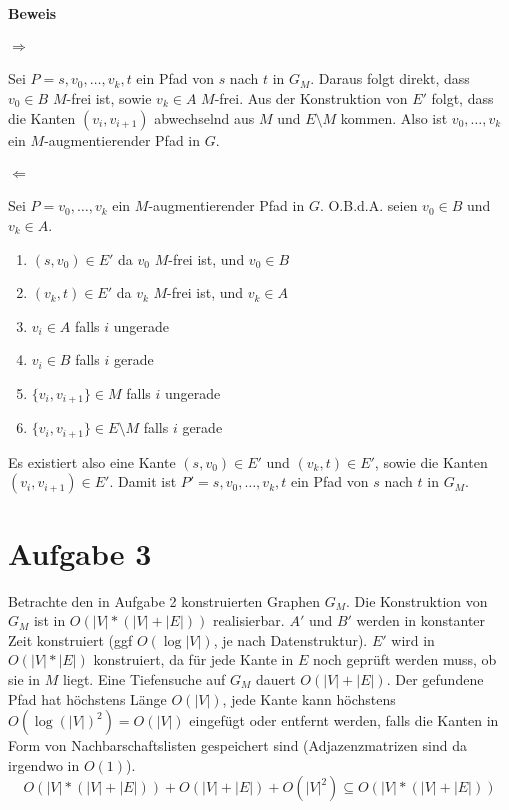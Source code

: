 \documentclass[10pt,a4paper]{article}
\begin{document}
\paragraph{Beweis}

\paragraph{$\Rightarrow$}
Sei $P = s, v_0, \ldots, v_k, t$ ein Pfad von $s$ nach $t$ in $G_M$.
Daraus folgt direkt, dass $v_0 \in B$ $M$-frei ist, sowie $v_k \in A$ $M$-frei.
Aus der Konstruktion von $E'$ folgt, dass die Kanten $(v_i, v_{i+1})$ abwechselnd aus $M$ und $E \setminus M$ kommen.
Also ist $v_0, \ldots, v_k$ ein $M$-augmentierender Pfad in $G$.

\paragraph{$\Leftarrow$}
Sei $P = v_0, \ldots, v_k$ ein $M$-augmentierender Pfad in $G$. O.B.d.A. seien $v_0 \in B$ und $v_k \in A$.
\begin{enumerate}
	\item $(s, v_0) \in E'$ da $v_0$ $M$-frei ist, und $v_0 \in B$
	\item $(v_k, t) \in E'$ da $v_k$ $M$-frei ist, und $v_k \in A$
	\item $v_i \in A$ falls $i$ ungerade
	\item $v_i \in B$ falls $i$ gerade
	\item $\{v_i, v_{i+1}\} \in M$ falls $i$ ungerade
	\item $\{v_i, v_{i+1}\} \in E \setminus M$ falls $i$ gerade
\end{enumerate}
Es existiert also eine Kante $(s, v_0) \in E'$ und $(v_k, t) \in E'$,
sowie die Kanten $(v_i, v_{i+1}) \in E'$.
Damit ist $P' = s, v_0, \ldots, v_k, t $ ein Pfad von $s$ nach $t$ in $G_M$.


\section*{Aufgabe 3}
Betrachte den in Aufgabe 2 konstruierten Graphen $G_M$.
Die Konstruktion von $G_M$ ist in $O(|V|*(|V|+|E|))$ realisierbar.
$A'$ und $B'$ werden in konstanter Zeit konstruiert (ggf $O(\log|V|)$, je nach Datenstruktur).
$E'$ wird in $O(|V|*|E|)$ konstruiert, da f\"ur jede Kante in $E$ noch gepr\"uft werden muss, ob sie in $M$ liegt.
Eine Tiefensuche auf $G_M$ dauert $O(|V|+|E|)$.
Der gefundene Pfad hat h\"ochstens L\"ange $O(|V|)$, jede Kante kann h\"ochstens $O(\log(|V|)^2) = O(|V|)$ eingef\"ugt oder entfernt werden, falls die Kanten in Form von Nachbarschaftslisten gespeichert sind (Adjazenzmatrizen sind da irgendwo in $O(1)$).
\begin{equation*}
O(|V|*(|V|+|E|)) + O(|V|+|E|) + O(|V|^2) \subseteq O(|V|*(|V|+|E|))
\end{equation*}
\end{document}
